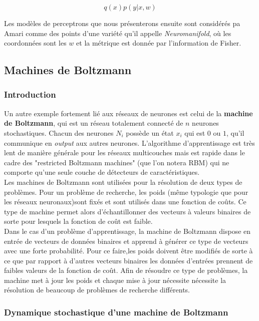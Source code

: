 \documentclass{article}
\theoremstyle{definition}
\begin{document}
\[q(x)p(y|x,w)\]

Les modèles de perceptrons que nous présenterons ensuite sont considérés pa Amari comme des points d'une variété qu'il appelle \textit{Neuromanifold}, où les coordonnées sont les $w$ et la métrique est donnée par l'information de Fisher.\\

\subsection{Machines de Boltzmann}

\subsubsection{Introduction}

\noindent Un autre exemple fortement lié aux réseaux de neurones est celui de la \textbf{machine de Boltzmann}, qui est un réseau totalement connecté de $n$ neurones stochastiques. Chacun des neurones $N_i$ possède un état $x_i$ qui est $0$ ou $1$, qu'il communique en \textit{output} aux autres neurones. L'algorithme d'apprentissage est très lent de manière générale pour les réseaux multicouches mais est rapide dans le cadre des "restricted Boltzmann machines" (que l'on notera RBM) qui ne comporte qu'une seule couche de détecteurs de caractéristiques.\\


\noindent Les machines de Boltzmann sont utilisées pour la résolution de deux types de problèmes. Pour un problème de recherche, les poids (même typologie que pour les réseaux neuronaux)sont fixés et sont utilisés dans une fonction de coûts. Ce type de machine permet alors d'échantillonner des vecteurs à valeurs binaires de sorte pour lesquels la fonction de coût est faible.\\

\noindent Dans le cas d'un problème d'apprentissage, la machine de Boltzmann dispose en entrée de vecteurs de données binaires et apprend à générer ce type de vecteurs avec une forte probabilité. Pour ce faire,les poids doivent être modifiés de sorte à ce que par rapport à d'autres vecteurs binaires les données d'entrées prennent de faibles valeurs de la fonction de coût. Afin de résoudre ce type de problèmes, la machine met à jour les poids et chaque mise à jour nécessite nécessite la résolution de beaucoup de problèmes de recherche différents.\\

\subsubsection{Dynamique stochastique d'une machine de Boltzmann}
\end{document}
